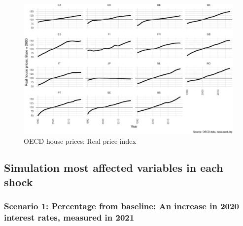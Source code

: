 \documentclass[
]{book}
\begin{document}
\begin{figure}
\centering
\includegraphics{figures/oecd-house-prices-facet-1.pdf}
\caption{\label{fig:oecd-house-prices-facet}OECD house prices: Real price index}
\end{figure}

\hypertarget{sec:fi-fl-sfc-Ap-A-scenario-summaries}{%
\subsection{Simulation most affected variables in each shock}\label{sec:fi-fl-sfc-Ap-A-scenario-summaries}}

\hypertarget{scenario-1-percentage-from-baseline-an-increase-in-2020-interest-rates-measured-in-2021}{%
\subsubsection{Scenario 1: Percentage from baseline: An increase in 2020 interest rates, measured in 2021}\label{scenario-1-percentage-from-baseline-an-increase-in-2020-interest-rates-measured-in-2021}}
\end{document}
